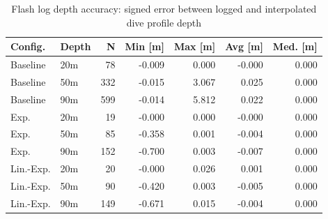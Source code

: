 \begin{table}[htbp]
\centering
\small
\renewcommand{\arraystretch}{1.15}
\begin{tabular}{llrrrrr}
\toprule
Config. & Depth & N & Min [m] & Max [m] & Avg [m] & Med. [m] \\
\midrule
Baseline & 20m & 78 & -0.009 & 0.000 & -0.000 & 0.000 \\
Baseline & 50m & 332 & -0.015 & 3.067 & 0.025 & 0.000 \\
Baseline & 90m & 599 & -0.014 & 5.812 & 0.022 & 0.000 \\
Exp. & 20m & 19 & -0.000 & 0.000 & -0.000 & 0.000 \\
Exp. & 50m & 85 & -0.358 & 0.001 & -0.004 & 0.000 \\
Exp. & 90m & 152 & -0.700 & 0.003 & -0.007 & 0.000 \\
Lin.-Exp. & 20m & 20 & -0.000 & 0.026 & 0.001 & 0.000 \\
Lin.-Exp. & 50m & 90 & -0.420 & 0.003 & -0.005 & 0.000 \\
Lin.-Exp. & 90m & 149 & -0.671 & 0.015 & -0.004 & 0.000 \\
\bottomrule
\end{tabular}
\caption{Flash log depth accuracy: signed error between logged and interpolated dive profile depth}
\label{tab:flash_profile_diff_summary}
\end{table}
